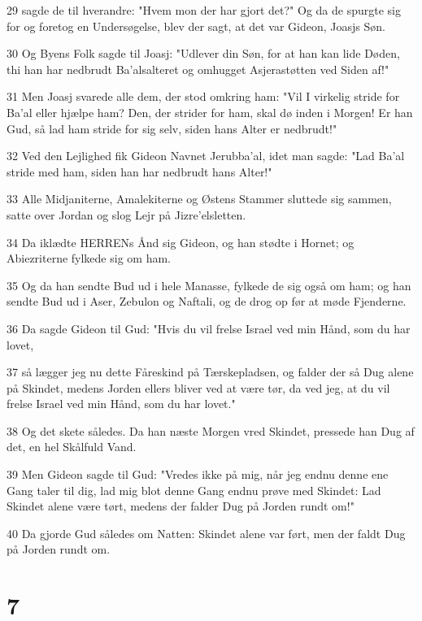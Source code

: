 \par 29 sagde de til hverandre: "Hvem mon der har gjort det?" Og da de spurgte sig for og foretog en Undersøgelse, blev der sagt, at det var Gideon, Joasjs Søn.
\par 30 Og Byens Folk sagde til Joasj: "Udlever din Søn, for at han kan lide Døden, thi han har nedbrudt Ba'alsalteret og omhugget Asjerastøtten ved Siden af!"
\par 31 Men Joasj svarede alle dem, der stod omkring ham: "Vil I virkelig stride for Ba'al eller hjælpe ham? Den, der strider for ham, skal dø inden i Morgen! Er han Gud, så lad ham stride for sig selv, siden hans Alter er nedbrudt!"
\par 32 Ved den Lejlighed fik Gideon Navnet Jerubba'al, idet man sagde: "Lad Ba'al stride med ham, siden han har nedbrudt hans Alter!"
\par 33 Alle Midjaniterne, Amalekiterne og Østens Stammer sluttede sig sammen, satte over Jordan og slog Lejr på Jizre'elsletten.
\par 34 Da iklædte HERRENs Ånd sig Gideon, og han stødte i Hornet; og Abiezriterne fylkede sig om ham.
\par 35 Og da han sendte Bud ud i hele Manasse, fylkede de sig også om ham; og han sendte Bud ud i Aser, Zebulon og Naftali, og de drog op før at møde Fjenderne.
\par 36 Da sagde Gideon til Gud: "Hvis du vil frelse Israel ved min Hånd, som du har lovet,
\par 37 så lægger jeg nu dette Fåreskind på Tærskepladsen, og falder der så Dug alene på Skindet, medens Jorden ellers bliver ved at være tør, da ved jeg, at du vil frelse Israel ved min Hånd, som du har lovet."
\par 38 Og det skete således. Da han næste Morgen vred Skindet, pressede han Dug af det, en hel Skålfuld Vand.
\par 39 Men Gideon sagde til Gud: "Vredes ikke på mig, når jeg endnu denne ene Gang taler til dig, lad mig blot denne Gang endnu prøve med Skindet: Lad Skindet alene være tørt, medens der falder Dug på Jorden rundt om!"
\par 40 Da gjorde Gud således om Natten: Skindet alene var ført, men der faldt Dug på Jorden rundt om.

\chapter{7}

